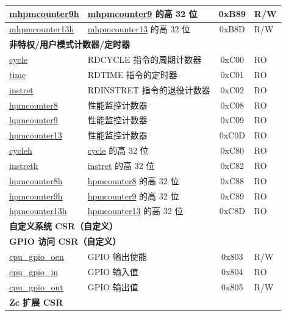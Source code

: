 \begin{longtable}{ | p{4.0cm} | p{8.4cm} | c | l | }
\hyperref[regdesc:MHPMCOUNTER9H]{mhpmcounter9h} & \hyperref[regdesc:MHPMCOUNTER9]{mhpmcounter9} 的高 32 位 & 0xB89 & R/W \\\hline
\hyperref[regdesc:MHPMCOUNTER13H]{mhpmcounter13h} & \hyperref[regdesc:MHPMCOUNTER13]{mhpmcounter13} 的高 32 位 & 0xB8D & R/W \\\hline
\multicolumn{4}{|l|}{\textbf{非特权/用户模式计数器/定时器}} \\\hline
\hyperref[regdesc:CYCLE]{cycle} & RDCYCLE 指令的周期计数器 & 0xC00 & RO\\\hline
\hyperref[regdesc:TIME]{time} & RDTIME 指令的定时器 & 0xC01 & RO \\\hline
\hyperref[regdesc:INSTRET]{instret} & RDINSTRET 指令的退役计数器 & 0xC02 & RO \\\hline
\hyperref[regdesc:HPMCOUNTER8]{hpmcounter8} & 性能监控计数器 & 0xC08 & RO \\\hline
\hyperref[regdesc:HPMCOUNTER9]{hpmcounter9} & 性能监控计数器 & 0xC09 & RO \\\hline
\hyperref[regdesc:HPMCOUNTER13]{hpmcounter13} & 性能监控计数器 & 0xC0D & RO \\\hline
\hyperref[regdesc:CYCLEH]{cycleh} & \hyperref[regdesc:CYCLE]{cycle} 的高 32 位 & 0xC80 & RO \\\hline
\hyperref[regdesc:INSTRETH]{instreth} & \hyperref[regdesc:INSTRET]{instret} 的高 32 位 & 0xC82 & RO \\\hline
\hyperref[regdesc:HPMCOUNTER8H]{hpmcounter8h} & \hyperref[regdesc:HPMCOUNTER8]{hpmcounter8} 的高 32 位 & 0xC88 & RO \\\hline
\hyperref[regdesc:HPMCOUNTER9H]{hpmcounter9h} & \hyperref[regdesc:HPMCOUNTER9]{hpmcounter9} 的高 32 位 & 0xC89 & RO \\\hline
\hyperref[regdesc:HPMCOUNTER13H]{hpmcounter13h} & \hyperref[regdesc:HPMCOUNTER13]{hpmcounter13} 的高 32 位 & 0xC8D & RO \\\hline
\multicolumn{4}{|l|}{\textbf{自定义系统 CSR（自定义）}} \\\hline
\multicolumn{4}{|l|}{\textbf{GPIO 访问 CSR（自定义）}} \\\hline
\hyperref[regdesc:GPIO_OEN]{cpu\_gpio\_oen} & GPIO 输出使能 & 0x803 & R/W \\\hline
\hyperref[regdesc:GPIO_IN]{cpu\_gpio\_in} & GPIO 输入值 & 0x804 & RO \\\hline
\hyperref[regdesc:GPIO_OUT]{cpu\_gpio\_out} & GPIO 输出值 & 0x805 & R/W \\\hline
\multicolumn{4}{|l|}{\textbf{Zc 扩展 CSR}} \\\hline

\end{longtable}
